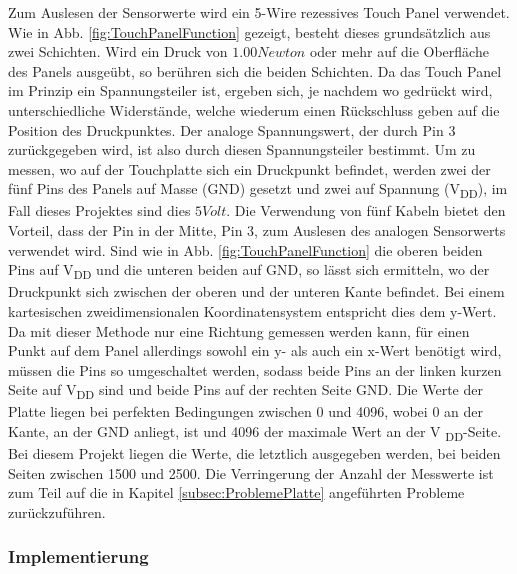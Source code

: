 \documentclass[12pt,a4paper,bibliography=totoc,listof=totoc]{scrartcl}
\begin{document}
Zum Auslesen der Sensorwerte wird ein 5-Wire rezessives Touch Panel verwendet.\newline
Wie in Abb. \ref{fig:TouchPanelFunction} \cite {wikipdeia} gezeigt, besteht dieses grundsätzlich aus zwei Schichten. Wird ein Druck von $1.00 Newton$ oder mehr auf die Oberfläche des Panels ausgeübt, so berühren sich die beiden Schichten. Da das Touch Panel im Prinzip ein Spannungsteiler ist, ergeben sich, je nachdem wo gedrückt wird, unterschiedliche Widerstände, welche wiederum einen Rückschluss geben auf die Position des Druckpunktes. Der analoge Spannungswert, der durch Pin 3 zurückgegeben wird, ist also durch diesen Spannungsteiler bestimmt.\newline
Um zu messen, wo auf der Touchplatte sich ein Druckpunkt befindet, werden zwei der fünf Pins des Panels auf Masse (GND) gesetzt und zwei auf Spannung (V\textsubscript{DD}), im Fall dieses Projektes sind dies $5 Volt$. Die Verwendung von fünf Kabeln bietet den Vorteil, dass der Pin in der Mitte, Pin 3, zum Auslesen des analogen Sensorwerts verwendet wird.
Sind wie in Abb. \ref{fig:TouchPanelFunction} die oberen beiden Pins auf V\textsubscript{DD} und die unteren beiden auf GND, so lässt sich ermitteln, wo der Druckpunkt sich zwischen der oberen und der unteren Kante befindet. Bei einem kartesischen zweidimensionalen Koordinatensystem entspricht dies dem y-Wert.
Da mit dieser Methode nur eine Richtung gemessen werden kann, für einen Punkt auf dem Panel allerdings sowohl ein y- als auch ein x-Wert benötigt wird, müssen die Pins so umgeschaltet werden, sodass beide Pins an der linken kurzen Seite auf V\textsubscript{DD} sind und beide Pins auf der rechten Seite GND.\newline
Die Werte der Platte liegen bei perfekten Bedingungen zwischen  0 und 4096, wobei 0 an der Kante, an der GND anliegt, ist und 4096 der maximale Wert an der V \textsubscript{DD}-Seite. Bei diesem Projekt liegen die Werte, die letztlich ausgegeben werden, bei beiden Seiten zwischen 1500 und 2500. Die Verringerung der Anzahl der Messwerte ist zum Teil auf die in Kapitel \ref{subsec:ProblemePlatte} angeführten Probleme zurückzuführen.

\subsubsection{Implementierung}
\end{document}
